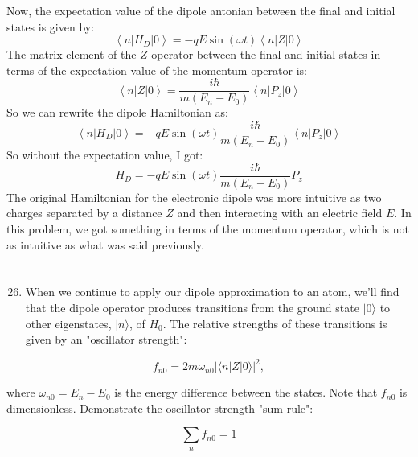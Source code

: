 \documentclass[12pt]{article}
\begin{document}
Now, the expectation value of the dipole antonian between the final and initial states is given by:
\begin{equation}
  \left\langle n\left|H_{D}\right| 0\right\rangle = -qE\sin(\omega t)\left\langle n\left|Z\right| 0\right\rangle
\end{equation}
The matrix element of the $Z$ operator between the final and initial states in terms of the expectation value of the momentum operator is:
\begin{equation}
  \left\langle n\left|Z\right| 0\right\rangle = \frac{i\hbar}{m(E_n-E_0)}\left\langle n\left|P_{z}\right| 0\right\rangle
\end{equation}
So we can rewrite the dipole Hamiltonian as:
\begin{equation}
  \left\langle n\left|H_{D}\right| 0\right\rangle = -qE\sin(\omega t)\frac{i\hbar}{m(E_n-E_0)}\left\langle n\left|P_{z}\right| 0\right\rangle
\end{equation}
So without the expectation value, I got:
\begin{equation}
  H_{D}=-qE\sin(\omega t)\frac{i\hbar}{m(E_n-E_0)}P_{z}
\end{equation}
The original Hamiltonian for the electronic dipole was more intuitive as two charges separated by a distance $Z$ and then interacting with an electric field $E$. In this problem, we got something in terms of the momentum operator, which is not as intuitive as what was said previously.
\section{}
\begin{enumerate}
  \setcounter{enumi}{25}
  \item When we continue to apply our dipole approximation to an atom, we'll find that the dipole operator produces transitions from the ground state $|0\rangle$ to other eigenstates, $|n\rangle$, of $H_{0}$. The relative strengths of these transitions is given by an "oscillator strength":
\end{enumerate}


\begin{equation*}
f_{n 0}=2 m \omega_{n 0}|\langle n|Z| 0\rangle|^{2}, \tag{2}
\end{equation*}


where $\omega_{n 0}=E_{n}-E_{0}$ is the energy difference between the states. Note that $f_{n 0}$ is dimensionless. Demonstrate the oscillator strength "sum rule":


\begin{equation*}
\sum_{n} f_{n 0}=1 \tag{3}
\end{equation*}
\end{document}
